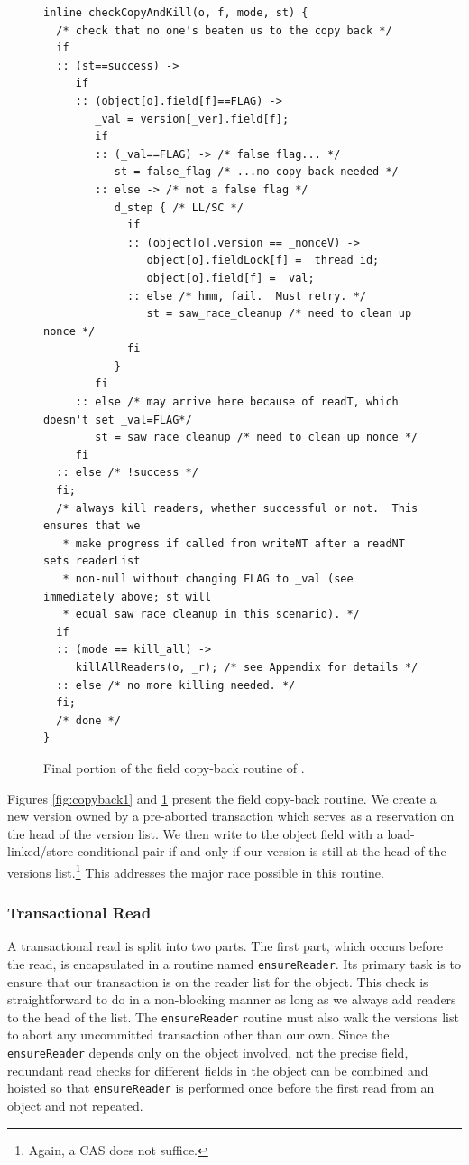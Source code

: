 \begin{figure}\sis\fontsize{9}{10}
\begin{verbatim}
inline checkCopyAndKill(o, f, mode, st) {
  /* check that no one's beaten us to the copy back */
  if
  :: (st==success) ->
     if
     :: (object[o].field[f]==FLAG) ->
        _val = version[_ver].field[f];
        if
        :: (_val==FLAG) -> /* false flag... */
           st = false_flag /* ...no copy back needed */
        :: else -> /* not a false flag */
           d_step { /* LL/SC */
             if
             :: (object[o].version == _nonceV) ->
                object[o].fieldLock[f] = _thread_id;
                object[o].field[f] = _val;
             :: else /* hmm, fail.  Must retry. */
                st = saw_race_cleanup /* need to clean up nonce */
             fi
           }
        fi
     :: else /* may arrive here because of readT, which doesn't set _val=FLAG*/
        st = saw_race_cleanup /* need to clean up nonce */
     fi
  :: else /* !success */
  fi;
  /* always kill readers, whether successful or not.  This ensures that we
   * make progress if called from writeNT after a readNT sets readerList
   * non-null without changing FLAG to _val (see immediately above; st will
   * equal saw_race_cleanup in this scenario). */
  if
  :: (mode == kill_all) ->
     killAllReaders(o, _r); /* see Appendix for details */
  :: else /* no more killing needed. */
  fi;
  /* done */
}
\end{verbatim}
\caption[Final portion of the field copy-back routine.]
 {Final portion of the field copy-back routine of .}
\label{fig:copyback2}
\end{figure}
Figures \ref{fig:copyback1} and \ref{fig:copyback2} present the field copy-back routine.  We create a
new version owned by a pre-aborted transaction which serves as a
reservation on the head of the version list.  We then write to the
object field with a load-linked/store-conditional pair if and only if
our version is still at the head of the versions list.\footnote{Again,
  a CAS does not suffice.}  This addresses
the major race possible in this routine.

\subsubsection{Transactional Read}\label{sec:readT}
A transactional read is split into two parts.  The first part, which
occurs before the read, is encapsulated in a routine named
\texttt{ensureReader}.  Its primary task is to
ensure that our transaction is on the reader list for the
object.  This check is straightforward to do in a non-blocking manner as
long as we always add readers to the head of the list.  The
\texttt{ensureReader} routine must also
walk the versions list to abort any uncommitted transaction other
than our own.  Since the \texttt{ensureReader} depends only on the
object involved, not the precise field, redundant read checks for
different fields in the object can be combined and hoisted so that 
\texttt{ensureReader} is performed
once before the first read from an object and not repeated.

